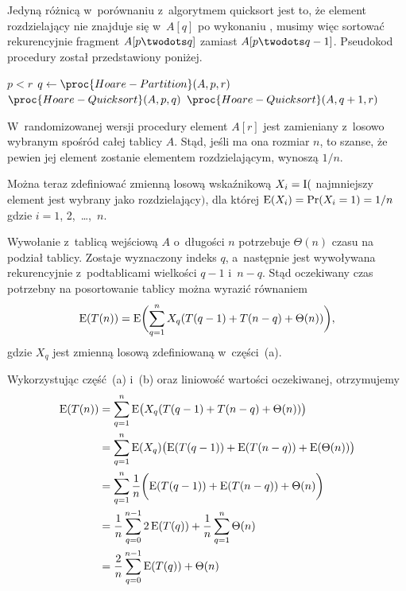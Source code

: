 \subproblem %
Jedyną różnicą w~porównaniu z~algorytmem quicksort jest to, że element rozdzielający nie znajduje się w~$A[q]$ po wykonaniu , musimy więc sortować rekurencyjnie fragment $A[p\twodots q]$ zamiast $A[p\twodots q-1]$. Pseudokod procedury został przedstawiony poniżej.
\begin{codebox}
\li	\If $p<r$
\li		\Then
			$q\gets\proc{Hoare-Partition}(A,p,r)$
\li			$\proc{Hoare-Quicksort}(A,p,q)$
\li			$\proc{Hoare-Quicksort}(A,q+1,r)$
		\End
\end{codebox}


\subproblem %
W~randomizowanej wersji procedury  element $A[r]$ jest zamieniany z~losowo wybranym spośród całej tablicy $A$. Stąd, jeśli ma ona rozmiar $n$, to szanse, że pewien jej element zostanie elementem rozdzielającym, wynoszą $1/n$.

Można teraz zdefiniować zmienną losową wskaźnikową $X_i=\operatorname{I}($ najmniejszy element jest wybrany jako rozdzielający$)$, dla której $\operatorname{E}(X_i)=\Pr(X_i=1)=1/n$ gdzie $i=1$, 2,~\dots,~$n$.

\subproblem %
Wywołanie  z~tablicą wejściową $A$ o~długości $n$ potrzebuje $\Theta(n)$ czasu na podział tablicy. Zostaje wyznaczony indeks $q$, a~następnie jest wywoływana rekurencyjnie  z~podtablicami wielkości $q-1$ i~$n-q$. Stąd oczekiwany czas potrzebny na posortowanie  tablicy można wyrazić równaniem
\[
	\operatorname{E}(T(n)) = \operatorname{E}\biggl(\sum_{q=1}^nX_q(T(q-1)+T(n-q)+\Theta(n))\biggr),
\]
gdzie $X_q$ jest zmienną losową zdefiniowaną w~części~(a).

\subproblem %
Wykorzystując część~(a) i~(b) oraz liniowość wartości oczekiwanej, otrzymujemy
\begin{align*}
	\operatorname{E}(T(n)) &= \sum_{q=1}^n\operatorname{E}\bigl(X_q(T(q-1)+T(n-q)+\Theta(n))\bigr) \\
	&= \sum_{q=1}^n\operatorname{E}(X_q)\bigl(\operatorname{E}(T(q-1))+\operatorname{E}(T(n-q))+\operatorname{E}(\Theta(n))\bigr) \\
	&= \sum_{q=1}^n\frac{1}{n}\biggl(\operatorname{E}(T(q-1))+\operatorname{E}(T(n-q))+\Theta(n)\biggr) \\
	&= \frac{1}{n}\sum_{q=0}^{n-1}2\operatorname{E}(T(q))+\frac{1}{n}\sum_{q=1}^n\Theta(n) \\
	&= \frac{2}{n}\sum_{q=0}^{n-1}\operatorname{E}(T(q))+\Theta(n)
\end{align*}

